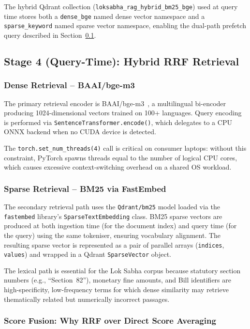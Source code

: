 \documentclass[conference]{IEEEtran}
\begin{document}
The hybrid Qdrant collection (\texttt{loksabha\_rag\_hybrid\_bm25\_bge})
used at query time stores both a \texttt{dense\_bge} named dense vector
namespace and a \texttt{sparse\_keyword} named sparse vector namespace,
enabling the dual-path prefetch query described in Section~\ref{sec:stage1}.

\subsection{Stage 4 (Query-Time): Hybrid RRF Retrieval}
\label{sec:stage1}

\subsubsection{Dense Retrieval -- BAAI/bge-m3}

The primary retrieval encoder is BAAI/bge-m3~\cite{mrag_settings2024},
a multilingual bi-encoder producing 1024-dimensional vectors trained on
100+ languages.
Query encoding is performed via \texttt{SentenceTransformer.encode()},
which delegates to a CPU ONNX backend when no CUDA device is detected.

The \texttt{torch.set\_num\_threads(4)} call is critical on consumer laptops:
without this constraint, PyTorch spawns threads equal to the number of logical
CPU cores, which causes excessive context-switching overhead on a shared OS
workload.

\subsubsection{Sparse Retrieval -- BM25 via FastEmbed}

The secondary retrieval path uses the \texttt{Qdrant/bm25} model loaded
via the \texttt{fastembed} library's \texttt{SparseTextEmbedding} class.
BM25 sparse vectors are produced at both ingestion time (for the document
index) and query time (for the query) using the same tokeniser, ensuring
vocabulary alignment.
The resulting sparse vector is represented as a pair of parallel arrays
(\texttt{indices}, \texttt{values}) and wrapped in a Qdrant
\texttt{SparseVector} object.

The lexical path is essential for the Lok Sabha corpus because statutory
section numbers (e.g., ``Section~82''), monetary fine amounts, and Bill
identifiers are high-specificity, low-frequency terms for which dense
similarity may retrieve thematically related but numerically incorrect passages.

\subsubsection{Score Fusion: Why RRF over Direct Score Averaging}
\end{document}
